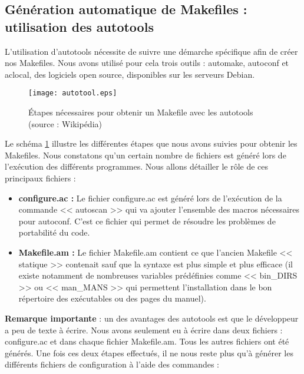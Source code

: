 \subsection{G\'en\'eration automatique de Makefiles : utilisation des autotools}
  
L'utilisation d'autotools n\'ecessite de suivre une d\'emarche sp\'ecifique afin de cr\'eer nos Makefiles. Nous avons utilis\'e pour
cela trois outils : automake\citep{automake}, autoconf\citep{tuto_autotool} et aclocal, des logiciels open source, disponibles sur les serveurs Debian.
\begin{figure}[h]
 \centerline{\texttt{[image: autotool.eps]}}
\caption{\'Etapes n\'ecessaires pour obtenir un Makefile avec les autotools (source : Wikip\'edia)} \label{fig:autotool}
\end{figure}
Le sch\'ema \ref{fig:autotool} illustre les diff\'erentes \'etapes que nous avons suivies pour obtenir les Makefiles.
Nous constatons qu'un certain nombre de fichiers est g\'en\'er\'e lors de l'ex\'ecution des diff\'erents programmes.
Nous allons d\'etailler le r\^ole de ces principaux fichiers :
\newline
\begin{itemize}
 \item [\textbullet] \textbf{ configure.ac :} Le fichier configure.ac est g\'en\'er\'e lors de l'ex\'ecution de la commande << autoscan >>
qui va ajouter l'ensemble des macros n\'ecessaires pour autoconf. C'est ce fichier qui permet de r\'esoudre les probl\`emes de portabilit\'e du code.
\newline
 \item [\textbullet] \textbf{ Makefile.am :} Le fichier Makefile.am contient ce que l'ancien Makefile << statique >> contenait sauf que la syntaxe est 
plus simple et plus efficace (il existe notamment de nombreuses variables pr\'ed\'efinies comme << bin\_DIRS >> ou << man\_MANS >> qui permettent l'installation
dans le bon r\'epertoire des ex\'ecutables ou des pages du manuel).  
\newline

\end{itemize}
\textbf{Remarque importante} : un des avantages des autotools est que le d\'eveloppeur a peu de texte \`a \'ecrire. Nous avons seulement eu \`a \'ecrire dans
deux fichiers : configure.ac et dans chaque fichier Makefile.am. Tous les autres fichiers ont \'et\'e g\'en\'er\'es.
\newline
\newline
Une fois ces deux \'etapes effectu\'es, il ne nous reste plus qu'\`a g\'en\'erer les diff\'erents fichiers de configuration \`a l'aide des commandes :
